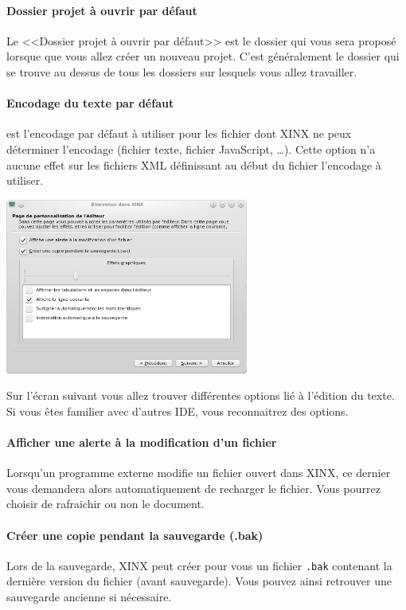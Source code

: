 \documentclass[a4paper,10pt,twoside]{book}
\begin{document}
\paragraph{Dossier projet à ouvrir par défaut} Le <<Dossier projet à ouvrir par défaut>> est le dossier qui vous sera proposé lorsque que vous allez créer un nouveau projet. C'est généralement le dossier qui se trouve au dessus de tous les dossiers sur lesquels vous allez travailler.

\paragraph{Encodage du texte par défaut} est l'encodage par défaut à utiliser pour les fichier dont XINX ne peux déterminer l'encodage (fichier texte, fichier JavaScript, \dots). Cette option n'a aucune effet sur les fichiers XML définissant au début du fichier l'encodage à utiliser.

\begin{center}
 \includegraphics[width=0.60\textwidth]{./firstinstall3.png}
\end{center}

Sur l'écran suivant vous allez trouver différentes options lié à l'édition du texte. Si vous êtes familier avec d'autres IDE, vous reconnaitrez des options. 

\paragraph{Afficher une alerte à la modification d'un fichier} Lorsqu'un programme externe modifie un fichier ouvert dans XINX, ce dernier vous demandera alors automatiquement de recharger le fichier. Vous pourrez choisir de rafraichir ou non le document.

\paragraph{Créer une copie pendant la sauvegarde (.bak)} Lors de la sauvegarde, XINX peut créer pour vous un fichier \verb+.bak+ contenant la dernière version du fichier (avant sauvegarde). Vous pouvez ainsi retrouver une sauvegarde ancienne si nécessaire.
\end{document}
